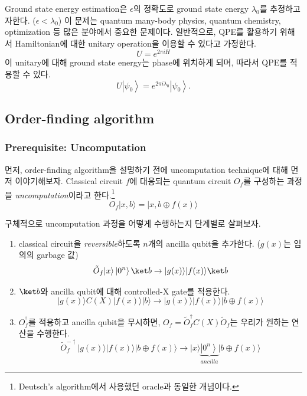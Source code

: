 \vspace{1em}

Ground state energy estimation은 $\epsilon$의 정확도로 ground state energy $\lambda_0$를 추정하고자한다. ($\epsilon < \lambda_0$)
이 문제는 quantum many-body physics, quantum chemistry, optimization 등 많은 분야에서 중요한 문제이다.
일반적으로, QPE를 활용하기 위해서 Hamiltonian에 대한 unitary operation을 이용할 수 있다고 가정한다.
\begin{equation*}
  U=e^{2 \pi i H}
\end{equation*}
이 unitary에 대해 ground state energy는 phase에 위치하게 되며, 따라서 QPE를 적용할 수 있다.
\begin{equation*}
  U\left|\psi_0\right\rangle=e^{2 \pi i \lambda_0}\left|\psi_0\right\rangle .
\end{equation*}

\subsection{Order-finding algorithm}
\subsubsection{Prerequisite: Uncomputation}\label{sec:uncomputation}
먼저, order-finding algorithm을 설명하기 전에 uncomputation technique에 대해 먼저 이야기해보자. Classical circuit $f$에 대응되는 quantum circuit $O_f$를 구성하는 과정을 \textit{uncomputation}이라고 한다.\footnote{Deutsch’s algorithm에서 사용했던 oracle과 동일한 개념이다.}
\begin{equation*}
  O_f|x, b\rangle=|x, b \oplus f(x)\rangle
\end{equation*}

구체적으로 uncomputation 과정을 어떻게 수행하는지 단계별로 살펴보자.
\begin{enumerate}
  \item classical circuit을 \textit{reversible}하도록 $n$개의 ancilla qubit을 추가한다. ($g(x)$는 임의의 garbage 값)
  \begin{equation*}
    \tilde O_f|x\rangle\left|0^n\right\rangle \ket b \rightarrow |g(x)\rangle|f(x)\rangle \ket b
  \end{equation*}
  \item $\ket b$와 ancilla qubit에 대해 controlled-X gate를 적용한다.
  \begin{equation*}
    |g(x)\rangle C(X) |f(x)\rangle|b\rangle \rightarrow |g(x)\rangle|f(x)\rangle|b \oplus f(x)\rangle
  \end{equation*}
  \item $O_f^{^\dagger}$를 적용하고 ancilla qubit을 무시하면, $O_f = \tilde O^\dagger_f C(X) \tilde O_f$는 우리가 원하는 연산을 수행한다.
  \begin{equation*}
    \tilde  O_f^{-\dagger}|g(x)\rangle|f(x)\rangle|b \oplus f(x)\rangle \rightarrow|x\rangle \underbrace{\left|0^n\right\rangle}_{ancilla} |b \oplus f(x)\rangle
  \end{equation*}
  
\end{enumerate}

